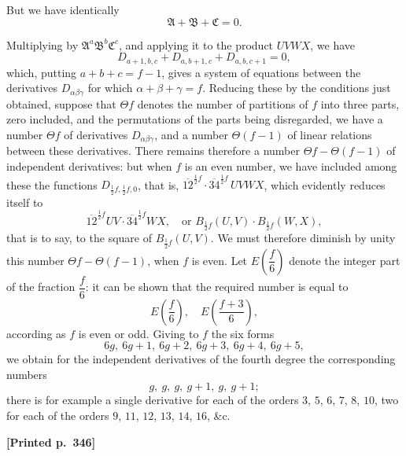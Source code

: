 \documentclass[11pt]{article}
\begin{document}
But we have identically
\[
\mathfrak{A} + \mathfrak{B} + \mathfrak{C} = 0.
\]

Multiplying by $\mathfrak{A}^{a}\mathfrak{B}^{b}\mathfrak{C}^{c}$, and applying it to the product $UVWX$, we have
\[
D_{a+1, b, c} + D_{a, b+1, c} + D_{a, b, c+1} = 0,
\]
which, putting $a + b + c = f - 1$, gives a system of equations between the derivatives $D_{\alpha\beta\gamma}$ for which $\alpha + \beta + \gamma = f$. Reducing these by the conditions just obtained, suppose that $\Theta f$ denotes the number of partitions of $f$ into three parts, zero included, and the permutations of the parts being disregarded, we have a number $\Theta f$ of derivatives $D_{\alpha\beta\gamma}$, and a number $\Theta(f - 1)$ of linear relations between these derivatives. There remains therefore a number $\Theta f - \Theta(f - 1)$ of independent derivatives: but when $f$ is an even number, we have included among these the functions $D_{\frac{1}{2}f, \frac{1}{2}f, 0}$, that is, $\overline{12}^{\frac{1}{2}f}\cdot\overline{34}^{\frac{1}{2}f}\, UVWX$, which evidently reduces itself to
\[
\overline{12}^{\frac{1}{2}f} UV \cdot \overline{34}^{\frac{1}{2}f} WX,\quad\text{or } B_{\frac{1}{2}f}(U, V)\cdot B_{\frac{1}{2}f}(W, X),
\]
that is to say, to the square of $B_{\frac{1}{2}f}(U, V)$. We must therefore diminish by unity this number $\Theta f - \Theta(f - 1)$, when $f$ is even. Let $E\!\left(\dfrac{f}{6}\right)$ denote the integer part of the fraction $\dfrac{f}{6}$: it can be shown that the required number is equal to
\[
E\!\left(\frac{f}{6}\right),\quad E\!\left(\frac{f + 3}{6}\right),
\]
according as $f$ is even or odd. Giving to $f$ the six forms
\[
6g,\ 6g + 1,\ 6g + 2,\ 6g + 3,\ 6g + 4,\ 6g + 5,
\]
we obtain for the independent derivatives of the fourth degree the corresponding numbers
\[
g,\ g,\ g,\ g + 1,\ g,\ g + 1;
\]
there is for example a single derivative for each of the orders $3$, $5$, $6$, $7$, $8$, $10$, two for each of the orders $9$, $11$, $12$, $13$, $14$, $16$, \&c.

\medskip

\noindent\textbf{[Printed p.~346]}\hfill
\end{document}
